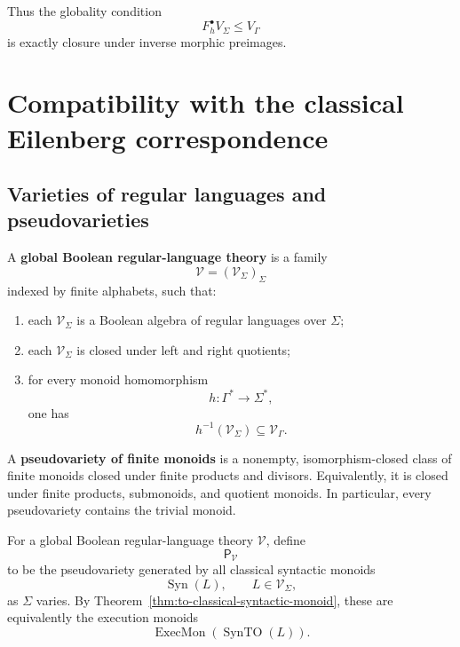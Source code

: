 Thus the globality condition
\[
    F_h^\bullet V_\Sigma\leq V_\Gamma
\]
is exactly closure under inverse morphic preimages.

\section{Compatibility with the classical Eilenberg correspondence}
\label{sec:to-classical-eilenberg}

\subsection{Varieties of regular languages and pseudovarieties}
\label{subsec:to-varieties-pseudovarieties}

\begin{definition}
\label{def:to-global-boolean-regular-theory}
    A \textbf{global Boolean regular-language theory} is a family
    \[
        \mathcal V=(\mathcal V_\Sigma)_\Sigma
    \]
    indexed by finite alphabets, such that:
    \begin{enumerate}
        \item each \(\mathcal V_\Sigma\) is a Boolean algebra of regular
        languages over \(\Sigma\);
        \item each \(\mathcal V_\Sigma\) is closed under left and right
        quotients;
        \item for every monoid homomorphism
        \[
            h:\Gamma^*\to\Sigma^*,
        \]
        one has
        \[
            h^{-1}(\mathcal V_\Sigma)
            \subseteq
            \mathcal V_\Gamma.
        \]
    \end{enumerate}
\end{definition}

A \textbf{pseudovariety of finite monoids} is a nonempty,
isomorphism-closed class of finite monoids closed under finite products and
divisors. Equivalently, it is closed under finite products, submonoids, and
quotient monoids. In particular, every pseudovariety contains the trivial
monoid.

For a global Boolean regular-language theory \(\mathcal V\), define
\[
    \mathsf P_{\mathcal V}
\]
to be the pseudovariety generated by all classical syntactic monoids
\[
    \operatorname{Syn}(L),
    \qquad
    L\in\mathcal V_\Sigma,
\]
as \(\Sigma\) varies. By
Theorem~\ref{thm:to-classical-syntactic-monoid}, these are equivalently the
execution monoids
\[
    \operatorname{ExecMon}(\operatorname{SynTO}(L)).
\]

